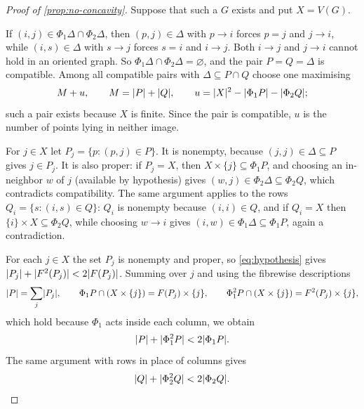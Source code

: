 \begin{proof}[Proof of \cref{prop:no-concavity}]
Suppose that such a $G$ exists and put $X=V(G)$.

If $(i,j)\in\Phi_1\Delta\cap\Phi_2\Delta$, then $(p,j)\in\Delta$ with $p\to i$ forces $p=j$ and
$j\to i$, while $(i,s)\in\Delta$ with $s\to j$ forces $s=i$ and $i\to j$. Both $i\to j$ and $j\to i$
cannot hold in an oriented graph. So $\Phi_1\Delta\cap\Phi_2\Delta=\varnothing$, and the pair
$P=Q=\Delta$ is compatible. Among all compatible pairs with $\Delta\subseteq P\cap Q$ choose one
maximising
\begin{equation}\label{eq:objective}
 M+u,\qquad M=\lvert P\rvert+\lvert Q\rvert,\qquad u=\lvert X\rvert^2-\lvert \Phi_1P\rvert-\lvert \Phi_2Q\rvert;
\end{equation}
such a pair exists because $X$ is finite. Since the pair is compatible, $u$ is the number of points
lying in neither image.

For $j\in X$ let $P_j=\{p:(p,j)\in P\}$. It is nonempty, because $(j,j)\in\Delta\subseteq P$ gives
$j\in P_j$. It is also proper: if $P_j=X$, then $X\times\{j\}\subseteq\Phi_1P$, and choosing an
in-neighbor $w$ of $j$ (available by hypothesis) gives $(w,j)\in\Phi_2\Delta\subseteq\Phi_2Q$, which
contradicts compatibility. The same argument applies to the rows $Q_i=\{s:(i,s)\in Q\}$: $Q_i$ is
nonempty because $(i,i)\in Q$, and if $Q_i=X$ then $\{i\}\times X\subseteq\Phi_2Q$, while choosing
$w\to i$ gives $(i,w)\in\Phi_1\Delta\subseteq\Phi_1P$, again a contradiction.

For each $j\in X$ the set $P_j$ is nonempty and proper, so \eqref{eq:hypothesis} gives
$\lvert P_j\rvert+\lvert F^2(P_j)\rvert<2\lvert F(P_j)\rvert$. Summing over $j$ and using the fibrewise descriptions
\begin{equation}\label{eq:fibers}
 \lvert P\rvert=\sum_{j}\lvert P_j\rvert,\qquad
 \Phi_1P\cap(X\times\{j\})=F(P_j)\times\{j\},\qquad
 \Phi_1^2P\cap(X\times\{j\})=F^2(P_j)\times\{j\},
\end{equation}
which hold because $\Phi_1$ acts inside each column, we obtain
\begin{equation}\label{eq:fiber-sums}
 \lvert P\rvert+\lvert \Phi_1^2P\rvert<2\lvert \Phi_1P\rvert.
\end{equation}
The same argument with rows in place of columns gives
\begin{equation}\label{eq:fiber-sums-Q}
 \lvert Q\rvert+\lvert \Phi_2^2Q\rvert<2\lvert \Phi_2Q\rvert.
\end{equation}


\end{proof}

